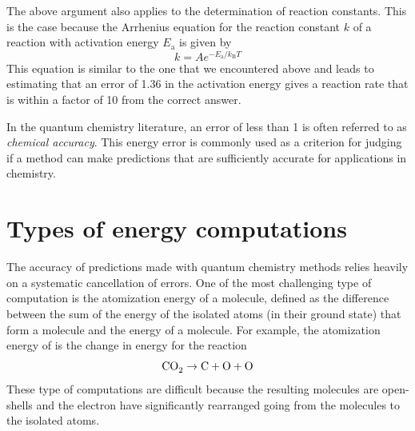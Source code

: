 \documentclass[../Main/notes.tex]{subfiles}
\begin{document}
The above argument also applies to the determination of reaction constants.
This is the case because the Arrhenius equation for the reaction constant $k$ of a reaction with activation energy $E_\mathrm{a}$ is given by 
\begin{equation}
k=A e^{-E_\mathrm {a} / k_\mathrm{B}  T}
\end{equation}
This equation is similar to the one that we encountered above and leads to estimating that an error of 1.36 \kcal in the activation energy gives a reaction rate that is within a factor of 10 from the correct answer.

In the quantum chemistry literature, an error of less than 1 \kcal is often referred to as \emph{chemical accuracy}.
This energy error is commonly used as a criterion for judging if a method can make predictions that are sufficiently accurate for applications in chemistry.

\section{Types of energy computations}
The accuracy of predictions made with quantum chemistry methods relies heavily on a systematic cancellation of errors.
One of the most challenging type of computation is the atomization energy of a molecule, defined as the difference between the sum of the energy of the isolated atoms (in their ground state) that form a molecule and the energy of a molecule.
For example, the atomization energy of  is the change in energy for the reaction
\begin{equation}
\ce{CO2} \rightarrow \ce{C} + \ce{O} + \ce{O}
\end{equation}
These type of computations are difficult because the resulting molecules are open-shells and the electron have significantly rearranged going from the molecules to the isolated atoms.
\end{document}
